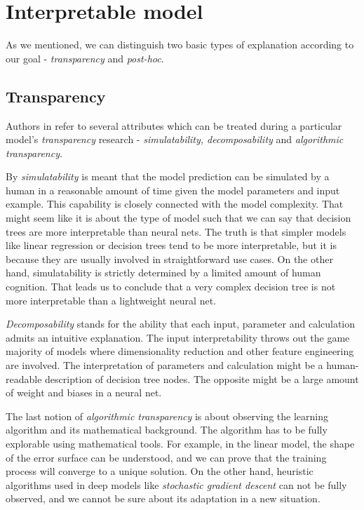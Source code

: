 \section{Interpretable model}
As we mentioned, we can distinguish two basic types of explanation according to our goal - \emph{transparency} and \emph{post-hoc}.

\subsection{Transparency}
Authors in \cite{Lipton2016} refer to several attributes which can be treated during a particular model's \emph{transparency} research - \emph{simulatability, decomposability} and \emph{algorithmic transparency}.

By \emph{simulatability} is meant that the model prediction can be simulated by a human in a reasonable amount of time given the model parameters and input example. This capability is closely connected with the model complexity. That might seem like it is about the type of model such that we can say that decision trees are more interpretable than neural nets. The truth is that simpler models like linear regression or decision trees tend to be more interpretable, but it is because they are usually involved in straightforward use cases. On the other hand, simulatability is strictly determined by a limited amount of human cognition. That leads us to conclude that a very complex decision tree is not more interpretable than a lightweight neural net.

\emph{Decomposability} stands for the ability that each input, parameter and calculation admits an intuitive explanation. The input interpretability throws out the game majority of models where dimensionality reduction and other feature engineering are involved. The interpretation of parameters and calculation might be a human-readable description of decision tree nodes. The opposite might be a large amount of weight and biases in a neural net.

The last notion of \emph{algorithmic transparency} is about observing the learning algorithm and its mathematical background. The algorithm has to be fully explorable using mathematical tools. For example, in the linear model, the shape of the error surface can be understood, and we can prove that the training process will converge to a unique solution. On the other hand, heuristic algorithms used in deep models like \emph{stochastic gradient descent} can not be fully observed, and we cannot be sure about its adaptation in a new situation.

